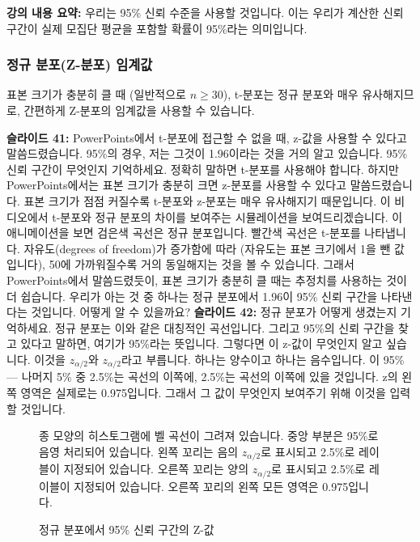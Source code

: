 \documentclass[11pt,a4paper]{article}
\begin{document}
\textbf{강의 내용 요약:}
우리는 95\% 신뢰 수준을 사용할 것입니다. 이는 우리가 계산한 신뢰 구간이 실제 모집단 평균을 포함할 확률이 95\%라는 의미입니다.

\subsubsection{정규 분포(Z-분포) 임계값}

표본 크기가 충분히 클 때 (일반적으로 $n \ge 30$), t-분포는 정규 분포와 매우 유사해지므로, 간편하게 Z-분포의 임계값을 사용할 수 있습니다.

\begin{tcolorbox}[title=슬라이드 41-42: 뉴욕 일일 기온 샘플 Excel 시트 (10/22 - 11/22)]
\textbf{슬라이드 41:} PowerPoints에서 t-분포에 접근할 수 없을 때, z-값을 사용할 수 있다고 말씀드렸습니다. 95\%의 경우, 저는 그것이 1.96이라는 것을 거의 알고 있습니다. 95\% 신뢰 구간이 무엇인지 기억하세요. 정확히 말하면 t-분포를 사용해야 합니다. 하지만 PowerPoints에서는 표본 크기가 충분히 크면 z-분포를 사용할 수 있다고 말씀드렸습니다. 표본 크기가 점점 커질수록 t-분포와 z-분포는 매우 유사해지기 때문입니다. 이 비디오에서 t-분포와 정규 분포의 차이를 보여주는 시뮬레이션을 보여드리겠습니다. 이 애니메이션을 보면 검은색 곡선은 정규 분포입니다. 빨간색 곡선은 t-분포를 나타냅니다. 자유도(degrees of freedom)가 증가함에 따라 (자유도는 표본 크기에서 1을 뺀 값입니다), 50에 가까워질수록 거의 동일해지는 것을 볼 수 있습니다. 그래서 PowerPoints에서 말씀드렸듯이, 표본 크기가 충분히 클 때는 추정치를 사용하는 것이 더 쉽습니다. 우리가 아는 것 중 하나는 정규 분포에서 1.96이 95\% 신뢰 구간을 나타낸다는 것입니다. 어떻게 알 수 있을까요?
\textbf{슬라이드 42:} 정규 분포가 어떻게 생겼는지 기억하세요. 정규 분포는 이와 같은 대칭적인 곡선입니다. 그리고 95\%의 신뢰 구간을 찾고 있다고 말하면, 여기가 95\%라는 뜻입니다. 그렇다면 이 z-값이 무엇인지 알고 싶습니다. 이것을 $z_{\alpha/2}$와 $z_{\alpha/2}$라고 부릅니다. 하나는 양수이고 하나는 음수입니다. 이 95\% — 나머지 5\% 중 2.5\%는 곡선의 이쪽에, 2.5\%는 곡선의 이쪽에 있을 것입니다. z의 왼쪽 영역은 실제로는 0.975입니다. 그래서 그 값이 무엇인지 보여주기 위해 이것을 입력할 것입니다.
\end{tcolorbox}

\begin{figure}[h!]
    \centering
    \begin{tcolorbox}[colback=myyellow!10!white, colframe=myyellow!75!black, title=그림 설명: 정규 분포에서 95\% 신뢰 구간의 Z-값]
    종 모양의 히스토그램에 벨 곡선이 그려져 있습니다. 중앙 부분은 95\%로 음영 처리되어 있습니다. 왼쪽 꼬리는 음의 $z_{\alpha/2}$로 표시되고 2.5\%로 레이블이 지정되어 있습니다. 오른쪽 꼬리는 양의 $z_{\alpha/2}$로 표시되고 2.5\%로 레이블이 지정되어 있습니다. 오른쪽 꼬리의 왼쪽 모든 영역은 0.975입니다.
    \end{tcolorbox}
    \caption{정규 분포에서 95\% 신뢰 구간의 Z-값}
    \label{fig:z_alpha_2}
\end{figure}
\end{document}
